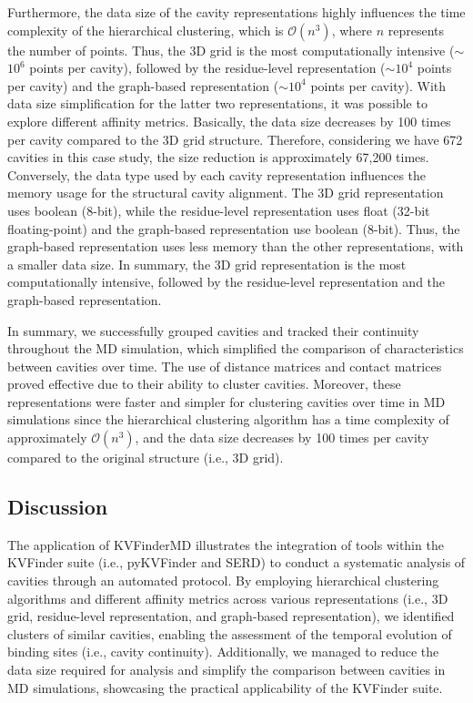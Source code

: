 \documentclass[Ingles]{phdthesis}
\def\ie{i.e.\onedot}
\begin{document}
Furthermore, the data size of the cavity representations highly influences the time complexity of the hierarchical clustering, which is $\mathcal{O}(n^3)$, where $n$ represents the number of points. Thus, the 3D grid is the most computationally intensive ($\sim$$10^6$ points per cavity), followed by the residue-level representation ($\sim$$10^4$ points per cavity) and the graph-based representation ($\sim$$10^4$ points per cavity). With data size simplification for the latter two representations, it was possible to explore different affinity metrics. Basically, the data size decreases by 100 times per cavity compared to the 3D grid structure. Therefore, considering we have 672 cavities in this case study, the size reduction is approximately 67,200 times. Conversely, the data type used by each cavity representation influences the memory usage for the structural cavity alignment. The 3D grid representation uses boolean (8-bit), while the residue-level representation uses float (32-bit floating-point) and the graph-based representation use boolean (8-bit). Thus, the graph-based representation uses less memory than the other representations, with a smaller data size. In summary, the 3D grid representation is the most computationally intensive, followed by the residue-level representation and the graph-based representation. 

In summary, we successfully grouped cavities and tracked their continuity throughout the \acs{MD} simulation, which simplified the comparison of characteristics between cavities over time. The use of distance matrices and contact matrices proved effective due to their ability to cluster cavities. Moreover, these representations were faster and simpler for clustering cavities over time in MD simulations since the hierarchical clustering algorithm has a time complexity of approximately $\mathcal{O}(n^3)$, and the data size decreases by 100 times per cavity compared to the original structure (\ie, 3D grid).

\subsection{Discussion}

The application of KVFinderMD illustrates the integration of tools within the KVFinder suite (\ie, pyKVFinder and SERD) to conduct a systematic analysis of cavities through an automated protocol. By employing hierarchical clustering algorithms and different affinity metrics across various representations (\ie, 3D grid, residue-level representation, and graph-based representation), we identified clusters of similar cavities, enabling the assessment of the temporal evolution of binding sites (\ie, cavity continuity). Additionally, we managed to reduce the data size required for analysis and simplify the comparison between cavities in \acs{MD} simulations, showcasing the practical applicability of the KVFinder suite.
\end{document}
